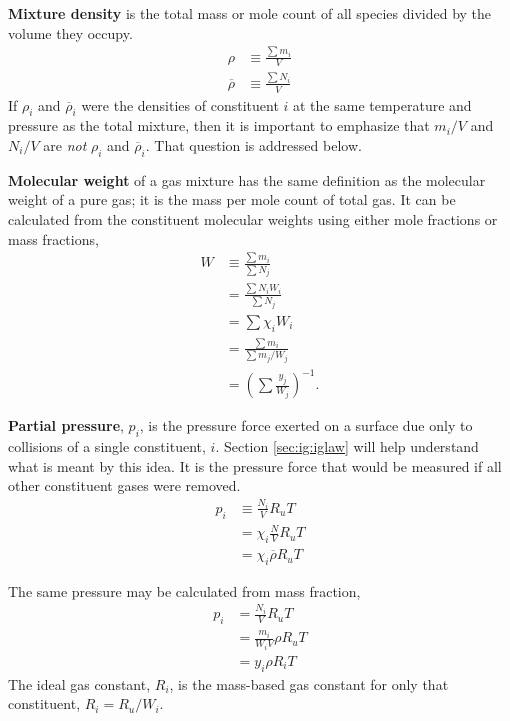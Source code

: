 {\bf Mixture density} is the total mass or mole count of all species divided by the volume they occupy.  
\begin{subequations}
\begin{align}
\rho &\equiv \frac{\sum m_i}{V}\\
\overline{\rho} &\equiv \frac{\sum N_i}{V}
\end{align}
\end{subequations}
If $\rho_i$ and $\overline{\rho}_i$ were the densities of constituent $i$ at the same temperature and pressure as the total mixture, then it is important to emphasize that $m_i / V$  and $N_i / V$ are \emph{not} $\rho_i$ and $\overline{\rho}_i$.  That question is addressed below.

{\bf Molecular weight} of a gas mixture has the same definition as the molecular weight of a pure gas; it is the mass per mole count of total gas.  It can be calculated from the constituent molecular weights using either mole fractions or mass fractions,
\begin{subequations}
\begin{align}
W &\equiv \frac{\sum m_i}{\sum N_j}\\
 &= \frac{\sum N_i W_i}{\sum N_j}\nonumber\\
 &= \sum \chi_i W_i\label{eqn:w:x}\\
 &= \frac{\sum m_i}{\sum m_j / W_j}\nonumber\\\
 &= \left(\sum \frac{y_j}{W_j} \right)^{-1}.\label{eqn:w:y}
\end{align}
\end{subequations}

{\bf Partial pressure}, $p_i$, is the pressure force exerted on a surface due only to collisions of a single constituent, $i$.  Section \ref{sec:ig:iglaw} will help understand what is meant by this idea.  It is the pressure force that would be measured if all other constituent gases were removed.  
\begin{align}
p_i &\equiv \frac{N_i}{V} R_u T \nonumber\\
 &= \chi_i \frac{N}{V} R_u T \nonumber\\
 &= \chi_i \overline{\rho} R_u T
\end{align}

The same pressure may be calculated from mass fraction,
\begin{align}
p_i &= \frac{N_i}{V} R_u T \nonumber\\
 &= \frac{m_i}{W_i V} \rho R_u T \nonumber\\
 &= y_i \rho R_i T
\end{align}
The ideal gas constant, $R_i$, is the mass-based gas constant for only that constituent, $R_i = R_u / W_i$.

